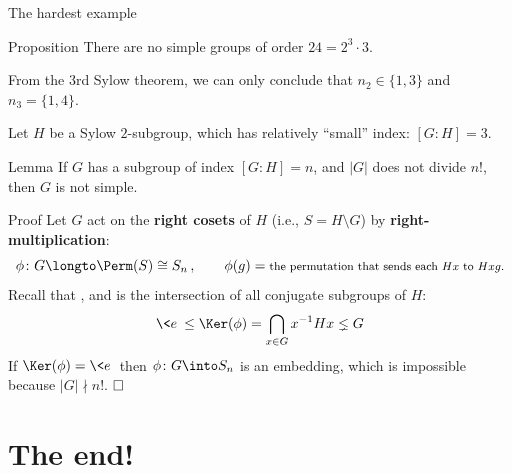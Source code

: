 \documentclass[8pt, handout]{beamer}
\newcommand{\Pause}{}      %
\begin{document}
\begin{frame}{The hardest example} %
  
  \begin{block}{Proposition}
    There are no simple groups of order $24=2^3\cdot 3$. 
  \end{block}

  \smallskip\Pause

  From the 3rd Sylow theorem, we can only conclude that $n_2\in\{1,3\}$ and
  $n_3=\{1,4\}$. \medskip\Pause
  
  Let $H$ be a Sylow $2$-subgroup, which has relatively ``small''
  index: $[G:H]=3$. \smallskip\Pause
  
  \begin{block}{Lemma}
    If $G$ has a subgroup of index $[G:H]=n$, and $|G|$ does not
    divide $n!$, then $G$ is not simple.
  \end{block}
  
  \vspace{-1mm}\Pause
  
  \begin{exampleblock}{Proof}
    Let $G$ act on the \textbf{right cosets} of $H$ (i.e., $S=H\!\setminus\!G$)
    by \textbf{right-multiplication}:
    \[
    \phi\colon G\longto\Perm(S)\cong S_n\,,\qquad
    \phi(g)=\mbox{\footnotesize the permutation that sends each $Hx$ to
      $Hxg$.}
    \] \Pause
    Recall that , and is the
    intersection of all conjugate subgroups of $H$:
    \[
    \<e\>\leq\Ker(\phi)=\bigcap_{x\in G}x^{-1}Hx\lneq G
    \] 
    \pause If $\Ker(\phi)=\<e\>$ then $\phi\colon G\into S_n$
    is an {\color{xBlue}embedding}, which is impossible
    because $|G|\nmid n!$. $\hfill\Box$
  \end{exampleblock}

\end{frame}


\section*{The end!}
\end{document}
